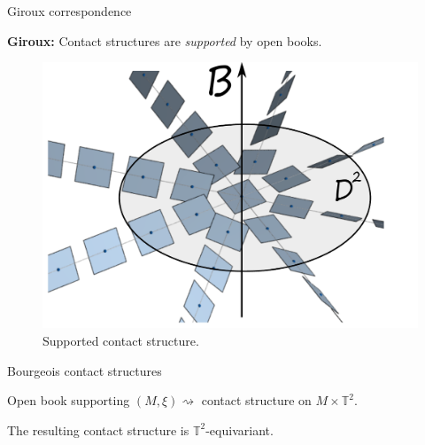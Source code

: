 \documentclass{beamer}
\begin{document}
\begin{frame}{Giroux correspondence}

\begin{tcolorbox}
\textbf{Giroux:} Contact structures are \emph{supported} by open books.
\end{tcolorbox} 

\begin{figure}
    \centering
    \includegraphics[width=0.6\linewidth]{standardctct.pdf}
    \caption{Supported contact structure.}
    \label{fig:adapted}
\end{figure}

\end{frame}

\begin{frame}{Bourgeois contact structures}
    \begin{theorem}[Bourgeois '02]
    Open book supporting $(M,\xi)\rightsquigarrow$ contact structure on $M\times \mathbb T^2$.
    \end{theorem}

 The resulting contact structure is $\mathbb T^2$-equivariant.   
    
\end{frame}
\end{document}
